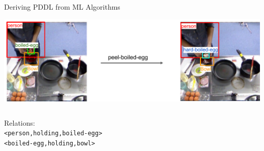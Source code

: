 \documentclass[usenames,dvipsnames]{beamer}
\begin{document}
\begin{frame}[c]{Deriving PDDL from ML Algorithms}
	\begin{center}
		\includegraphics[width=.9\textwidth]{fig/computer-vision-transition1.pdf}
	\end{center}
	\begin{columns}
		\begin{column}{.4\textwidth}
			Relations:\\
			\footnotesize
			\texttt{<{\color{red}person},{\color{black}holding},{\color{OliveGreen}boiled-egg}>}\\
			\texttt{<{\color{OliveGreen}boiled-egg},{\color{black}holding},{\color{orange}bowl}>}
		\end{column}
		\begin{column}{.6\textwidth}
			
		\end{column}
	\end{columns}
\end{frame}
\end{document}
